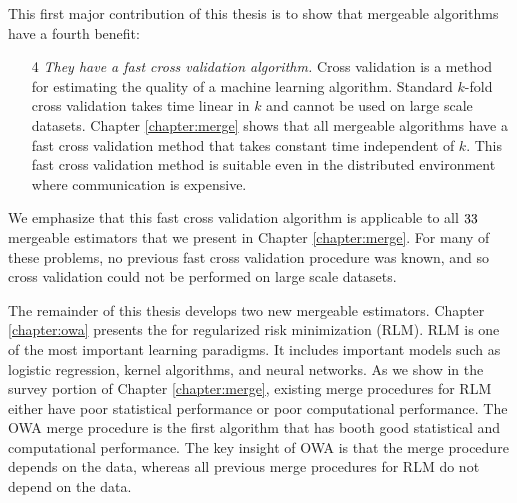 \documentclass[thesis.tex]{subfiles}
\begin{document}
This first major contribution of this thesis is to show that mergeable algorithms have a fourth benefit:
\begin{enumerate}
    \item[4]
        \emph{They have a fast cross validation algorithm.}
    Cross validation is a method for estimating the quality of a machine learning algorithm.
    Standard $k$-fold cross validation takes time linear in $k$ and cannot be used on large scale datasets.
    Chapter \ref{chapter:merge} shows that all mergeable algorithms have a fast cross validation method that takes constant time independent of $k$.
    This fast cross validation method is suitable even in the distributed environment where communication is expensive.
\end{enumerate}
We emphasize that this fast cross validation algorithm is applicable to all $33$ mergeable estimators that we present in Chapter \ref{chapter:merge}.
For many of these problems, no previous fast cross validation procedure was known,
and so cross validation could not be performed on large scale datasets.

The remainder of this thesis develops two new mergeable estimators.
Chapter \ref{chapter:owa} presents the  for regularized risk minimization (RLM).
RLM is one of the most important learning paradigms.
It includes important models such as logistic regression, kernel algorithms, and neural networks.
As we show in the survey portion of Chapter \ref{chapter:merge}, 
existing merge procedures for RLM either have poor statistical performance or poor computational performance.
The OWA merge procedure is the first algorithm that has booth good statistical and computational performance.
The key insight of OWA is that the merge procedure depends on the data,
whereas all previous merge procedures for RLM do not depend on the data.
\end{document}
